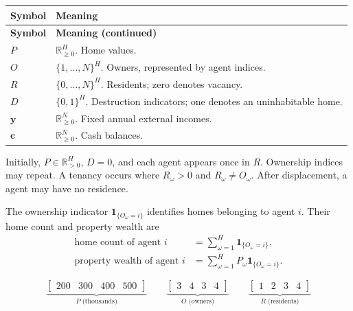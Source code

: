 \documentclass[10pt]{article}
\begin{document}
\begingroup
\renewcommand{\arraystretch}{1.0}
\setlength{\LTpre}{2pt}
\setlength{\LTpost}{2pt}
\begin{longtable}{@{}p{}>{\raggedright\arraybackslash}p{}@{}}
\toprule
\textbf{Symbol} & \textbf{Meaning} \\
\midrule
\endfirsthead
\toprule
\textbf{Symbol} & \textbf{Meaning (continued)} \\
\midrule
\endhead
\bottomrule
\endfoot
$P$ & $\mathbb{R}_{\geq0}^{H}$. Home values. \\
$O$ & $\{1,\ldots,N\}^{H}$. Owners, represented by agent indices. \\
$R$ & $\{0,\ldots,N\}^{H}$. Residents; zero denotes vacancy. \\
$D$ & $\{0,1\}^{H}$. Destruction indicators; one denotes an uninhabitable home. \\
$\mathbf{y}$ & $\mathbb{R}_{\geq0}^{N}$. Fixed annual external incomes. \\
$\mathbf{c}$ & $\mathbb{R}_{\geq0}^{N}$. Cash balances. \\
\end{longtable}

Initially, $P\in\mathbb{R}_{>0}^{H}$, $D=0$, and each agent appears once in $R$. Ownership indices may repeat. A tenancy occurs where $R_\omega>0$ and $R_\omega\ne O_\omega$. After displacement, a agent may have no residence.

The ownership indicator $\mathbf{1}_{\{O_\omega=i\}}$ identifies homes belonging to agent $i$. Their home count and property wealth are
\begin{equation}
\begin{aligned}
 \text{home count of agent }i &= \sum_{\omega=1}^{H}\mathbf{1}_{\{O_\omega=i\}},\\
 \text{property wealth of agent }i &= \sum_{\omega=1}^{H}P_\omega\mathbf{1}_{\{O_\omega=i\}}.
\end{aligned}
\end{equation}

\begingroup
\makeatletter{}\makeatother
\[
\underbrace{\begin{bmatrix}200&300&400&500\end{bmatrix}}_{P\text{ (thousands)}}
\qquad
\underbrace{\begin{bmatrix}3&4&3&4\end{bmatrix}}_{O\text{ (owners)}}
\qquad
\underbrace{\begin{bmatrix}1&2&3&4\end{bmatrix}}_{R\text{ (residents)}}
\]
\caption{Illustrative allocation of four homes, listed by $\omega$: agents 1 and 2 rent from 3 and 4. Each owner holds two homes, worth 600 and 800 thousand respectively.}
\label{fig:matrices}
\endgroup
\end{document}
